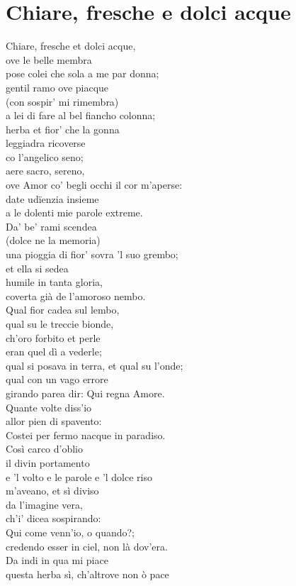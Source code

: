 \documentclass[10pt,a4paper]{article}
\begin{document}
\section{Chiare, fresche e dolci acque}

\begin{estratto}
	Chiare, fresche et dolci acque,\\
	ove le belle membra\\
	pose colei che sola a me par donna;\\
	gentil ramo ove piacque\\
	(con sospir’ mi rimembra)\\
	a lei di fare al bel fiancho colonna;\\
	herba et fior’ che la gonna\\
	leggiadra ricoverse\\
	co l’angelico seno;\\
	aere sacro, sereno,\\
	ove Amor co’ begli occhi il cor m’aperse:\\
	date udïenzia insieme\\
	a le dolenti mie parole extreme.\\
	
	Da’ be’ rami scendea\\
	(dolce ne la memoria)\\
	una pioggia di fior’ sovra ’l suo grembo;\\
	et ella si sedea\\
	humile in tanta gloria,\\
	coverta già de l’amoroso nembo.\\
	Qual fior cadea sul lembo,\\
	qual su le treccie bionde,\\
	ch’oro forbito et perle\\
	eran quel dì a vederle;\\
	qual si posava in terra, et qual su l’onde;\\
	qual con un vago errore\\
	girando parea dir: Qui regna Amore.\\
	
	Quante volte diss’io\\
	allor pien di spavento:\\
	Costei per fermo nacque in paradiso.\\
	Così carco d’oblio\\
	il divin portamento\\
	e ’l volto e le parole e ’l dolce riso\\
	m’aveano, et sì diviso\\
	da l’imagine vera,\\
	ch’i’ dicea sospirando:\\
	Qui come venn’io, o quando?;\\
	credendo esser in ciel, non là dov’era.\\
	Da indi in qua mi piace\\
	questa herba sì, ch’altrove non ò pace\\
\end{estratto}
\end{document}
